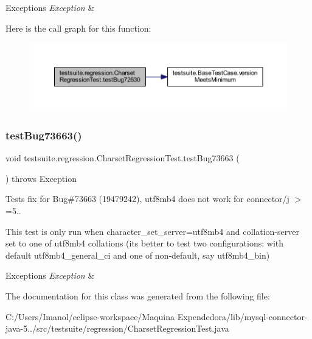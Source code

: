 \begin{DoxyExceptions}{Exceptions}
{\em Exception} & \\
\hline
\end{DoxyExceptions}
Here is the call graph for this function\+:
\nopagebreak
\begin{figure}[H]
\begin{center}
\leavevmode
\includegraphics[width=350pt]{classtestsuite_1_1regression_1_1_charset_regression_test_aea47a9d0535dd2e8b09f2be63c4c5100_cgraph}
\end{center}
\end{figure}
\mbox{\label{classtestsuite_1_1regression_1_1_charset_regression_test_a46c2702ffcbb3408a1b7fe21ba7b02d5}} 
\subsubsection{\texorpdfstring{test\+Bug73663()}{testBug73663()}}
{\footnotesize\ttfamily void testsuite.\+regression.\+Charset\+Regression\+Test.\+test\+Bug73663 (\begin{DoxyParamCaption}{ }\end{DoxyParamCaption}) throws Exception}

Tests fix for Bug\#73663 (19479242), utf8mb4 does not work for connector/j $>$=5..

This test is only run when character\+\_\+set\+\_\+server=utf8mb4 and collation-\/server set to one of utf8mb4 collations (it\textquotesingle{}s better to test two configurations\+: with default utf8mb4\+\_\+general\+\_\+ci and one of non-\/default, say utf8mb4\+\_\+bin)


\begin{DoxyExceptions}{Exceptions}
{\em Exception} & \\
\hline
\end{DoxyExceptions}


The documentation for this class was generated from the following file\+:\begin{DoxyCompactItemize}
\item 
C\+:/\+Users/\+Imanol/eclipse-\/workspace/\+Maquina Expendedora/lib/mysql-\/connector-\/java-\/5../src/testsuite/regression/Charset\+Regression\+Test.\+java\end{DoxyCompactItemize}
